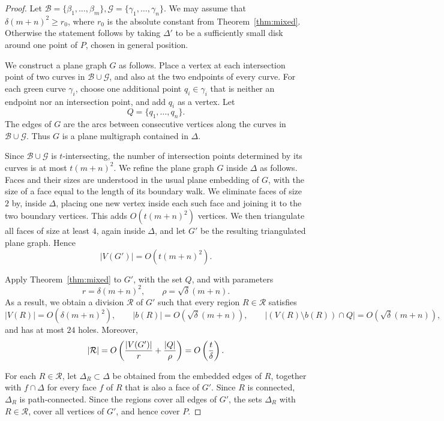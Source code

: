 \documentclass[10pt,a4paper]{amsart}
\begin{document}
\begin{proof}
Let $\mathcal B=\{\beta_1,\ldots,\beta_m\}, \mathcal G=\{\gamma_1,\ldots,\gamma_n\}$. We may assume that \(\delta(m+n)^2\ge r_0\), where \(r_0\) is the absolute
constant from Theorem~\ref{thm:mixed}. Otherwise the statement follows by taking \(\Delta'\) to be a sufficiently
small disk around one point of \(P\), chosen in general position.

We construct a plane graph \(G\) as follows. Place a vertex at each
intersection point of two curves in \(\mathcal B\cup\mathcal G\), and also at
the two endpoints of every curve. For each green curve \(\gamma_i\), choose
one additional point \(q_i\in\gamma_i\) that is neither an endpoint nor an
intersection point, and add \(q_i\) as a vertex. Let
\[
Q=\{q_1,\ldots,q_n\}.
\]
The edges of \(G\) are the arcs between consecutive vertices along the curves
in \(\mathcal B\cup\mathcal G\). Thus \(G\) is a plane multigraph contained
in \(\Delta\).   

Since \(\mathcal B\cup\mathcal G\) is \(t\)-intersecting, the number of
intersection points determined by its curves is at most \(t(m+n)^2\). We
refine the plane graph \(G\) inside \(\Delta\) as follows.  Faces and their
sizes are understood in the usual plane embedding of \(G\), with the size of a
face equal to the length of its boundary walk. We eliminate
faces of size \(2\) by, inside $\Delta$, placing one new vertex inside each such face and
joining it to the two boundary vertices. This adds \(O(t(m+n)^2)\) vertices.
We then triangulate all faces of size at least \(4\), again inside
\(\Delta\), and let \(G'\) be the resulting triangulated plane graph. Hence
\[
|V(G')|=O(t(m+n)^2).
\]



Apply Theorem~\ref{thm:mixed} to \(G'\), with the set \(Q\), and with
parameters
\[
r=\delta(m+n)^2,\qquad \rho=\sqrt\delta(m+n).
\]
As a result, we obtain a division \(\mathcal R\) of \(G'\) such that every region
\(R\in\mathcal R\) satisfies
\[
|V(R)|=O(\delta(m+n)^2),\qquad
|b(R)|=O(\sqrt\delta(m+n)),\qquad
|(V(R)\setminus b(R))\cap Q|=O(\sqrt\delta(m+n)),
\]
and has at most \(24\) holes. Moreover,
\[
|\mathcal R|
=
O\left({|V(G')|\over r}+{|Q|\over \rho}\right)
=
O\left({t\over\delta}\right).
\]

For each \(R\in\mathcal R\), let \(\Delta_R\subset \Delta\) be obtained from
the embedded edges of \(R\), together with \(f\cap\Delta\) for every face
\(f\) of \(R\) that is also a face of \(G'\). Since \(R\) is connected,
\(\Delta_R\) is path-connected. Since the regions cover all edges of \(G'\),
the sets \(\Delta_R\) with \(R\in\mathcal R\), cover all vertices of \(G'\), and
hence cover \(P\).  


\end{proof}
\end{document}
